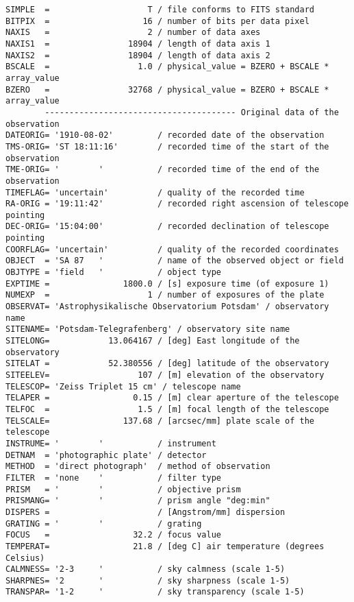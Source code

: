 \documentclass[11pt]{ivoa}
\begin{document}
\begin{lstlisting}
SIMPLE  =                    T / file conforms to FITS standard
BITPIX  =                   16 / number of bits per data pixel
NAXIS   =                    2 / number of data axes
NAXIS1  =                18904 / length of data axis 1
NAXIS2  =                18904 / length of data axis 2
BSCALE  =                  1.0 / physical_value = BZERO + BSCALE * array_value
BZERO   =                32768 / physical_value = BZERO + BSCALE * array_value
        --------------------------------------- Original data of the observation
DATEORIG= '1910-08-02'         / recorded date of the observation
TMS-ORIG= 'ST 18:11:16'        / recorded time of the start of the observation
TME-ORIG= '        '           / recorded time of the end of the observation
TIMEFLAG= 'uncertain'          / quality of the recorded time
RA-ORIG = '19:11:42'           / recorded right ascension of telescope pointing
DEC-ORIG= '15:04:00'           / recorded declination of telescope pointing
COORFLAG= 'uncertain'          / quality of the recorded coordinates
OBJECT  = 'SA 87   '           / name of the observed object or field
OBJTYPE = 'field   '           / object type
EXPTIME =               1800.0 / [s] exposure time (of exposure 1)
NUMEXP  =                    1 / number of exposures of the plate
OBSERVAT= 'Astrophysikalische Observatorium Potsdam' / observatory name
SITENAME= 'Potsdam-Telegrafenberg' / observatory site name
SITELONG=            13.064167 / [deg] East longitude of the observatory
SITELAT =            52.380556 / [deg] latitude of the observatory
SITEELEV=                  107 / [m] elevation of the observatory
TELESCOP= 'Zeiss Triplet 15 cm' / telescope name
TELAPER =                 0.15 / [m] clear aperture of the telescope
TELFOC  =                  1.5 / [m] focal length of the telescope
TELSCALE=               137.68 / [arcsec/mm] plate scale of the telescope
INSTRUME= '        '           / instrument
DETNAM  = 'photographic plate' / detector
METHOD  = 'direct photograph'  / method of observation
FILTER  = 'none    '           / filter type
PRISM   = '        '           / objective prism
PRISMANG= '        '           / prism angle "deg:min"
DISPERS =                      / [Angstrom/mm] dispersion
GRATING = '        '           / grating
FOCUS   =                 32.2 / focus value
TEMPERAT=                 21.8 / [deg C] air temperature (degrees Celsius)
CALMNESS= '2-3     '           / sky calmness (scale 1-5)
SHARPNES= '2       '           / sky sharpness (scale 1-5)
TRANSPAR= '1-2     '           / sky transparency (scale 1-5)

\end{lstlisting}
\end{document}
